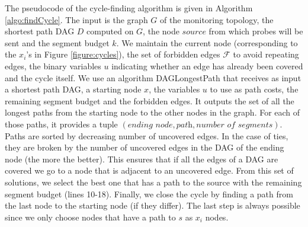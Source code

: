 \smallskip

The pseudocode of the cycle-finding algorithm is given in Algorithm
\ref{algo:findCycle}. The input is the graph $G$ of the monitoring topology, the
shortest path DAG $D$ computed on $G$, the node $source$ from which probes will
be sent and the segment budget $k$. We maintain the current node (corresponding
to the $x_i$'s in Figure \ref{figure:cycles}), the set of forbidden edges
$\mathcal{F}$ to avoid repeating edges, the binary variables $u$ indicating
whether an edge has already been covered and the cycle itself.
%
We use an algorithm \textsf{DAGLongestPath} that receives as input a shortest path DAG, a 
starting node $x$, the variables $u$ to use as path costs, the remaining segment budget
and the forbidden edges. It outputs the set of all the longest paths from the starting node
to the other nodes in the graph. For each of those paths, it provides a tuple
$(\textit{ending node}, \textit{path}, \textit{number of segments})$. Paths are
sorted by decreasing number of uncovered edges. In the case of
ties, they are broken by the number of uncovered edges in the DAG of the ending
node (the more the better). This ensures that if all the edges of a DAG are
covered we go to a node that is adjacent to an uncovered edge.
From this set of solutions, we select the best one that has a path to the
source with the remaining segment budget (lines 10-18).
Finally, we close the cycle by finding a path from the last node to the starting
node (if they differ). The last step is always possible since we only choose nodes
that have a path to $s$ as $x_i$ nodes.

